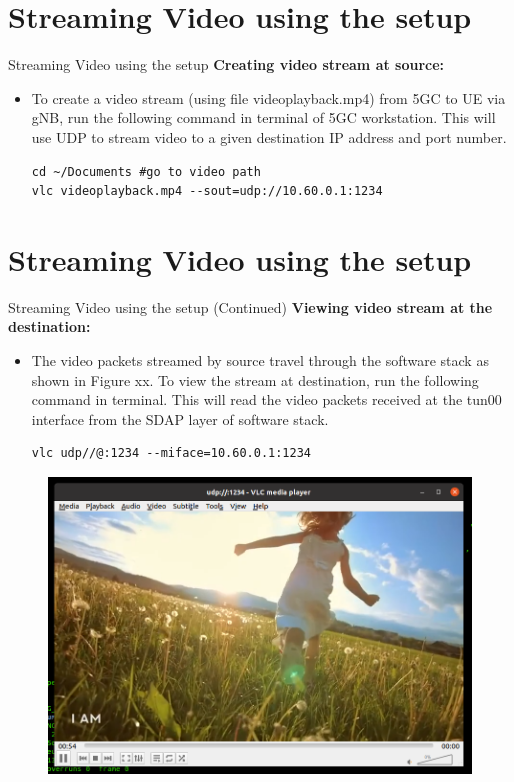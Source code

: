 \documentclass[xcolor=table]{beamer}
\begin{document}
\section{Streaming Video using the setup}
\begin{frame}[fragile]{Streaming Video using the setup}
\textbf{Creating video stream at source:}\\
\begin{itemize}
 \item 
 To create a video stream (using file videoplayback.mp4) from 5GC to UE via gNB, run the following command in terminal of 5GC workstation. This will use UDP to stream video to a given destination IP address and port number.\\
\begin{lstlisting}
cd ~/Documents #go to video path
vlc videoplayback.mp4 --sout=udp://10.60.0.1:1234
\end{lstlisting}
\end{itemize}
\end{frame}

\section{Streaming Video using the setup}
\begin{frame}[fragile]{Streaming Video using the setup \small{(Continued)}}
\textbf{Viewing video stream at the destination:}\\
\begin{itemize}
 \item The video packets streamed by source travel through the software stack as shown in Figure xx.
To view the stream at destination, run the following command in terminal. This will read the video packets received at the tun00 interface from the SDAP layer of software stack.\\
\begin{lstlisting}
vlc udp//@:1234 --miface=10.60.0.1:1234
\end{lstlisting}
\end{itemize}
\begin{figure}[h!]
  		\centering
  		\includegraphics[width=0.5\linewidth]{./figs/Destination_viewing_stream.png}
  		\label{Destination_viewing_stream}
	\end{figure}
\end{frame}
\end{document}
